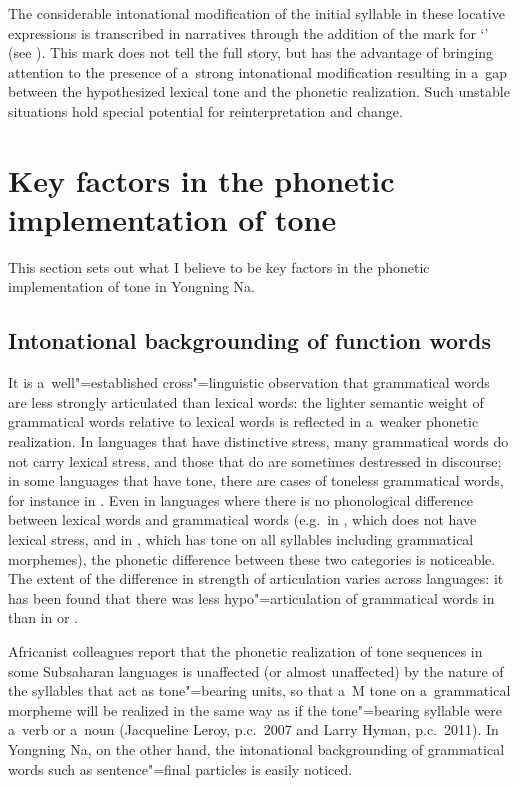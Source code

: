 The considerable intonational modification of the initial syllable in these locative expressions is
transcribed in narratives through the addition of the mark for  ‘’ (see ). This mark does not
tell the full story, but has the advantage of bringing attention to the presence of a~strong
intonational modification resulting in a~gap between the hypothesized lexical tone and the phonetic realization. Such unstable situations hold special potential for reinterpretation and change.

\section{Key factors in the phonetic implementation of tone}
\label{sec:keyfactorsinthephoneticimplementationoftone}

This section sets out what I believe to be key factors in the phonetic implementation of tone in Yongning Na.

\subsection{Intonational backgrounding of function words}
\label{sec:consequencesoftheweakrealizationofgrammaticalwords}
\label{sec:intonationalbackgroundingofparticles}

It is a~well"=established cross"=linguistic observation that grammatical words are less strongly
articulated than lexical words: 
the lighter semantic weight of grammatical
words relative to lexical words is reflected in a~weaker phonetic realization. In languages that have distinctive stress, many grammatical words do
not carry lexical stress, and those that do are sometimes destressed in discourse; in some languages
that have tone, there are cases of toneless grammatical words, for instance in  \citep{linetal1980,chenetal2006}. Even in languages where there is no phonological difference between lexical words and
grammatical words (e.g.~in , which does not have lexical stress, and in , which
has tone on all syllables including grammatical morphemes), the phonetic difference between these
two categories is noticeable. The extent of the difference in strength of articulation varies across languages: it has been found that there was less hypo"=articulation of
grammatical words in  than in  or  \citep{brunelle2015}.  

Africanist colleagues report that the
phonetic realization of tone sequences in some Subsaharan languages is unaffected (or almost
unaffected) by the nature of the syllables that act as tone"=bearing units, so that a~M tone on
a~grammatical morpheme will be realized in the same way as if the tone"=bearing syllable were a~verb
or a~noun (Jacqueline Leroy, p.c.\ 2007 and Larry Hyman, p.c.\ 2011). In Yongning Na, on the other hand, the intonational
backgrounding of grammatical words such as sentence"=final particles is easily noticed. 


